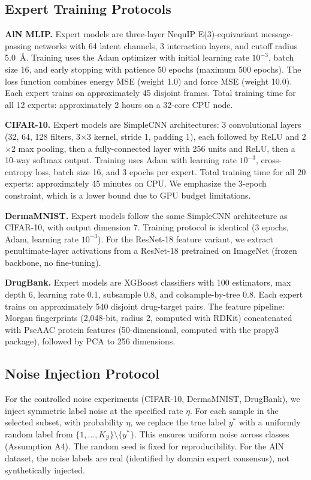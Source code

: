 \documentclass[11pt,a4paper]{article}
\begin{document}
\subsection{Expert Training Protocols}

\textbf{AlN MLIP.} Expert models are three-layer NequIP E(3)-equivariant message-passing networks with 64 latent channels, 3 interaction layers, and cutoff radius 5.0~\AA. Training uses the Adam optimizer with initial learning rate $10^{-3}$, batch size 16, and early stopping with patience 50 epochs (maximum 500 epochs). The loss function combines energy MSE (weight 1.0) and force MSE (weight 10.0). Each expert trains on approximately 45 disjoint frames. Total training time for all 12 experts: approximately 2 hours on a 32-core CPU node.

\textbf{CIFAR-10.} Expert models are SimpleCNN architectures: 3 convolutional layers (32, 64, 128 filters, 3$\times$3 kernel, stride 1, padding 1), each followed by ReLU and 2$\times$2 max pooling, then a fully-connected layer with 256 units and ReLU, then a 10-way softmax output. Training uses Adam with learning rate $10^{-3}$, cross-entropy loss, batch size 16, and 3 epochs per expert. Total training time for all 20 experts: approximately 45 minutes on CPU. We emphasize the 3-epoch constraint, which is a lower bound due to GPU budget limitations.

\textbf{DermaMNIST.} Expert models follow the same SimpleCNN architecture as CIFAR-10, with output dimension 7. Training protocol is identical (3 epochs, Adam, learning rate $10^{-3}$). For the ResNet-18 feature variant, we extract penultimate-layer activations from a ResNet-18 pretrained on ImageNet (frozen backbone, no fine-tuning).

\textbf{DrugBank.} Expert models are XGBoost classifiers with 100 estimators, max depth 6, learning rate 0.1, subsample 0.8, and colsample-by-tree 0.8. Each expert trains on approximately 540 disjoint drug-target pairs. The feature pipeline: Morgan fingerprints (2,048-bit, radius 2, computed with RDKit) concatenated with PseAAC protein features (50-dimensional, computed with the propy3 package), followed by PCA to 256 dimensions.

\subsection{Noise Injection Protocol}

For the controlled noise experiments (CIFAR-10, DermaMNIST, DrugBank), we inject symmetric label noise at the specified rate $\eta$. For each sample in the selected subset, with probability $\eta$, we replace the true label $y^*$ with a uniformly random label from $\{1, \ldots, K_{\mathcal{Y}}\} \setminus \{y^*\}$. This ensures uniform noise across classes (Assumption A4). The random seed is fixed for reproducibility. For the AlN dataset, the noise labels are real (identified by domain expert consensus), not synthetically injected.
\end{document}
